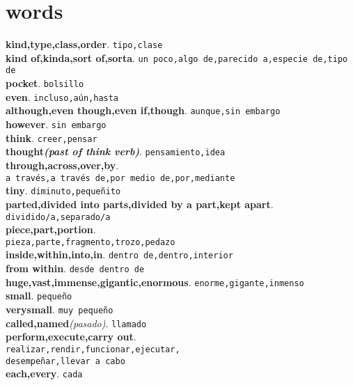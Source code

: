 \documentclass[twocolumn]{article}
\begin{document}
  \section{words}
	\textsf{\textbf{kind,type,class,order}}. \texttt{tipo,clase}\\
	\textsf{\textbf{kind of,kinda,sort of,sorta}}. \texttt{un poco,algo de,parecido a,especie de,tipo de}\\
	\textsf{\textbf{pocket}}. \texttt{bolsillo}\\
	\textsf{\textbf{even}}. \texttt{incluso,a\'un,hasta}\\
	\textsf{\textbf{although,even though,even if,though}}. \texttt{aunque,sin embargo}\\ 
	\textsf{\textbf{however}}. \texttt{sin embargo}\\
	\textsf{\textbf{think}}. \texttt{creer,pensar}\\
	\textsf{\textbf{thought{\scriptsize \textsl{(past of think verb)}}}}. \texttt{pensamiento,idea}\\
	\textsf{\textbf{through,across,over,by}}.\\\texttt{a trav\'es,a trav\'es de,por medio de,por,mediante}\\  
	\textsf{\textbf{tiny}}. \texttt{diminuto,peque\~nito}\\ 
	\textsf{\textbf{parted,divided into parts,divided by a part,kept apart}}. \texttt{dividido/a,separado/a}\\ 
	\textsf{\textbf{piece,part,portion}}.\\\texttt{pieza,parte,fragmento,trozo,pedazo}\\
	\textsf{\textbf{inside,within,into,in}}. \texttt{dentro de,dentro,interior}\\
	\textsf{\textbf{from within}}. \texttt{desde dentro de}\\
	\textsf{\textbf{huge,vast,immense,gigantic,enormous}}. \texttt{enorme,gigante,inmenso}\\
	\textsf{\textbf{small}}. \texttt{peque\~no}\\
	\textsf{\textbf{verysmall}}. \texttt{muy peque\~no}\\
	\textsf{\textbf{called,named}{\scriptsize \textsl{(pasado)}}}. \texttt{llamado}\\
	\textsf{\textbf{perform,execute,carry out}}.\\\texttt{realizar,rendir,funcionar,ejecutar,\\desempe\~nar,llevar a cabo}\\
	\textsf{\textbf{each,every}}. \texttt{cada}\\
\end{document}
